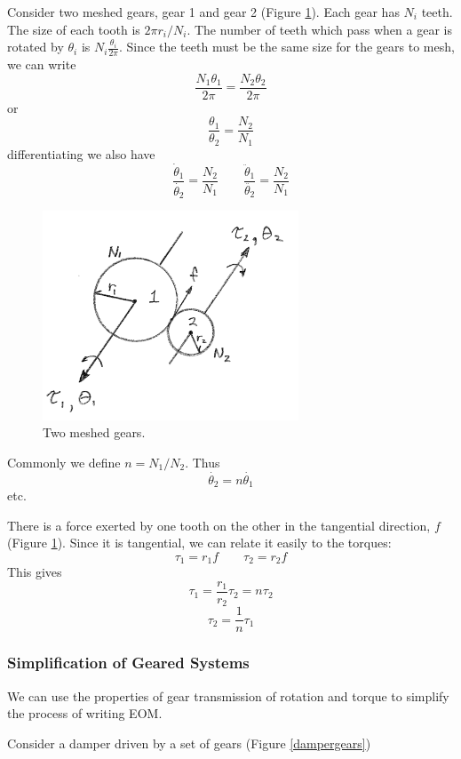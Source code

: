 Consider two meshed gears, gear 1 and gear 2 (Figure \ref{2meshedgears}).  
Each gear has $N_i$ teeth.    
The size of each tooth is $2\pi r_i/ N_i$.  The number of teeth which pass when a gear is rotated by $\theta_i$ is $N_i\frac{\theta_i}{2\pi}$.
Since the teeth must be the same size for the gears to mesh, we can write
\[
\frac{N_1\theta_1}{2\pi} = \frac{N_2\theta_2}{2\pi}
\]
or
\[
\frac {\theta_1}{\theta_2}  =  \frac{N_2}{N_1}
\]
differentiating we also have
\[
\frac { \dot{\theta}_1}{ \dot{\theta_2}}  =  \frac{N_2}{N_1} \qquad 
\frac {\ddot{\theta}_1}{\ddot{\theta_2}}  =  \frac{N_2}{N_1}
\]

\begin{figure}\centering
\includegraphics[width=3.0in]{figs03/00744.png}
\caption{Two meshed gears.}\label{2meshedgears}
\end{figure}

Commonly we define $n  = N_1/N_2$.   Thus
\[
\dot{\theta_2} = n \dot{\theta_1}
\]
etc. 


There is a force exerted by one tooth on the other in the tangential direction, $f$ (Figure \ref{2meshedgears}).  Since it is tangential, we can relate it easily to the torques:
\[
\tau_1 = r_1f \qquad \tau_2 = r_2f
\]
This gives 
\[
\tau_1 = \frac{r_1}{r_2}\tau_2 = n\tau_2
\]
\[
\tau_2 = \frac{1}{n} \tau_1
\]

\subsubsection{Simplification of Geared Systems}

We can use the properties of gear transmission of rotation and torque to simplify the process of writing EOM.

Consider a damper driven by a set of gears (Figure \ref{dampergears})

